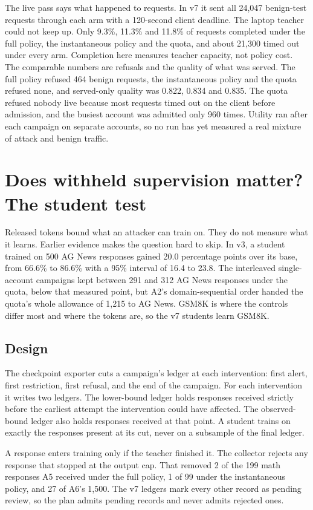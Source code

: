 \documentclass[journal]{IEEEtran}
\begin{document}
The live pass says what happened to requests. In v7 it sent all 24,047 benign-test requests through each arm with a 120-second client deadline. The laptop teacher could not keep up. Only 9.3\%, 11.3\% and 11.8\% of requests completed under the full policy, the instantaneous policy and the quota, and about 21,300 timed out under every arm. Completion here measures teacher capacity, not policy cost. The comparable numbers are refusals and the quality of what was served. The full policy refused 464 benign requests, the instantaneous policy and the quota refused none, and served-only quality was 0.822, 0.834 and 0.835. The quota refused nobody live because most requests timed out on the client before admission, and the busiest account was admitted only 960 times. Utility ran after each campaign on separate accounts, so no run has yet measured a real mixture of attack and benign traffic.

\section{Does withheld supervision matter? The student test}
\label{sec:students}
Released tokens bound what an attacker can train on. They do not measure what it learns. Earlier evidence makes the question hard to skip. In v3, a student trained on 500 AG News responses gained 20.0 percentage points over its base, from 66.6\% to 86.6\% with a 95\% interval of 16.4 to 23.8. The interleaved single-account campaigns kept between 291 and 312 AG News responses under the quota, below that measured point, but A2's domain-sequential order handed the quota's whole allowance of 1,215 to AG News. GSM8K is where the controls differ most and where the tokens are, so the v7 students learn GSM8K.

\subsection{Design}
The checkpoint exporter cuts a campaign's ledger at each intervention: first alert, first restriction, first refusal, and the end of the campaign. For each intervention it writes two ledgers. The lower-bound ledger holds responses received strictly before the earliest attempt the intervention could have affected. The observed-bound ledger also holds responses received at that point. A student trains on exactly the responses present at its cut, never on a subsample of the final ledger.

A response enters training only if the teacher finished it. The collector rejects any response that stopped at the output cap. That removed 2 of the 199 math responses A5 received under the full policy, 1 of 99 under the instantaneous policy, and 27 of A6's 1,500. The v7 ledgers mark every other record as pending review, so the plan admits pending records and never admits rejected ones.
\end{document}
